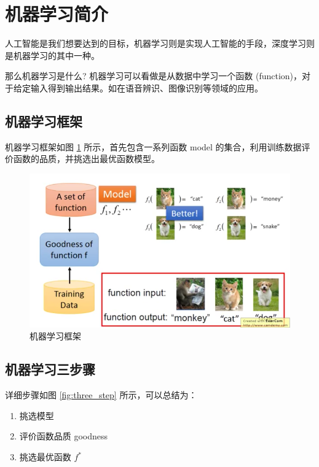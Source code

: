 \section{机器学习简介}
人工智能是我们想要达到的目标，机器学习则是实现人工智能的手段，深度学习则是机器学习的其中一种。

那么机器学习是什么? 机器学习可以看做是从数据中学习一个函数 (function)，对于给定输入得到输出结果。如在语音辨识、图像识别等领域的应用。
\subsection{机器学习框架}
机器学习框架如图 \ref{fig:ml_framework} 所示，首先包含一系列函数 model 的集合，利用训练数据评价函数的品质，并挑选出最优函数模型。

\begin{figure}[ht]
	\centering
	\includegraphics[scale=0.4]{./pic/ml_framework.png}
	\caption{机器学习框架}
	\label{fig:ml_framework}
\end{figure}
\subsection{机器学习三步骤}
\label{sec:three_step}
详细步骤如图 \ref{fig:three_step} 所示，可以总结为：

\begin{enumerate}
	\item 挑选模型
	\item 评价函数品质 goodness
	\item 挑选最优函数 $f^*$
\end{enumerate}
	
